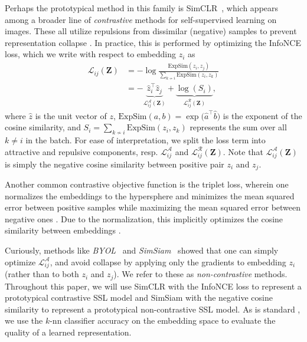 Perhaps the prototypical method in this family is SimCLR~\cite{simclr}, which appears among a broader line of \emph{contrastive} methods for self-supervised learning on images. These all utilize repulsions from dissimilar (negative) samples to prevent representation collapse \citep{contr_pred_coding, data_efficient_cpc, moco, mocov2, pirl}. In practice, this is performed by optimizing the InfoNCE loss, which we write with respect to embedding $z_i$ as 
\begin{align}
    \label{eq:infonce}
    \mathcal{L}_{ij}(\mathbf{Z}) &= -\log \frac{\text{ExpSim}(z_i, z_j)}{\sum_{k \not\sim i} \text{ExpSim}(z_i, z_k)} \\
    &= -\underbrace{\hat{z}_i^\top \hat{z}_j}_{\mathcal{L}^\mathcal{A}_{ij}(\mathbf{Z})} + \underbrace{\log \left( S_i \right)}_{\mathcal{L}^\mathcal{R}_{ij}(\mathbf{Z})} \nonumber,
\end{align}
where $\hat{z}$ is the unit vector of $z$, $\text{ExpSim}(a, b) = \exp \big( \hat{a}^\top \hat{b} \big)$ is the exponent of the cosine similarity, and $S_i = \sum_{k \not\sim i} \text{ExpSim}(z_i, z_k)$ represents the sum over all $k \neq i$ in the batch. For ease of interpretation, we split the loss term into attractive and repulsive components, resp. $\mathcal{L}^\mathcal{A}_{ij}$ and $\mathcal{L}^\mathcal{R}_{ij}(\mathbf{Z})$. Note that $\mathcal{L}^\mathcal{A}_{ij}(\mathbf{Z})$ is simply the negative cosine similarity between positive pair $z_i$ and $z_j$.

Another common contrastive objective function is the triplet loss, wherein one normalizes the embeddings to the hypersphere and minimizes the mean squared error between positive samples while maximizing the mean squared error between negative ones \citep{triplet_loss}. Due to the normalization, this implicitly optimizes the cosine similarity between embeddings \citep{byol}.

Curiously, methods like \emph{BYOL}~\cite{byol} and \emph{SimSiam}~\cite{simsiam} showed that one can simply optimize $\mathcal{L}^\mathcal{A}_{ij}$, and avoid collapse by applying only the gradients to embedding $z_i$ (rather than to both $z_i$ and $z_j$). We refer to these as \emph{non-contrastive} methods. Throughout this paper, we will use SimCLR with the InfoNCE loss to represent a prototypical contrastive SSL model and SimSiam with the negative cosine similarity to represent a prototypical non-contrastive SSL model. As is standard \cite{dinov2}, we use the $k$-nn classifier accuracy on the embedding space to evaluate the quality of a learned representation.


